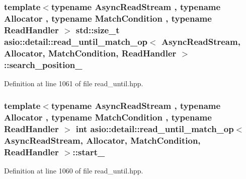 \hypertarget{classasio_1_1detail_1_1read__until__match__op_a314bf10d03fcd41db2fc7ad6a43f0dce}{}
\subsubsection[{search\+\_\+position\+\_\+}]{\setlength{\rightskip}{0pt plus 5cm}template$<$typename Async\+Read\+Stream , typename Allocator , typename Match\+Condition , typename Read\+Handler $>$ std\+::size\+\_\+t {\bf asio\+::detail\+::read\+\_\+until\+\_\+match\+\_\+op}$<$ Async\+Read\+Stream, Allocator, Match\+Condition, Read\+Handler $>$\+::search\+\_\+position\+\_\+}\label{classasio_1_1detail_1_1read__until__match__op_a314bf10d03fcd41db2fc7ad6a43f0dce}


Definition at line 1061 of file read\+\_\+until.\+hpp.

\hypertarget{classasio_1_1detail_1_1read__until__match__op_a65742efa0b628e922efe3935b64c6c5f}{}
\subsubsection[{start\+\_\+}]{\setlength{\rightskip}{0pt plus 5cm}template$<$typename Async\+Read\+Stream , typename Allocator , typename Match\+Condition , typename Read\+Handler $>$ int {\bf asio\+::detail\+::read\+\_\+until\+\_\+match\+\_\+op}$<$ Async\+Read\+Stream, Allocator, Match\+Condition, Read\+Handler $>$\+::start\+\_\+}\label{classasio_1_1detail_1_1read__until__match__op_a65742efa0b628e922efe3935b64c6c5f}


Definition at line 1060 of file read\+\_\+until.\+hpp.

\hypertarget{classasio_1_1detail_1_1read__until__match__op_a4dd4e8d24de8028f6aafe609887913a9}{}
